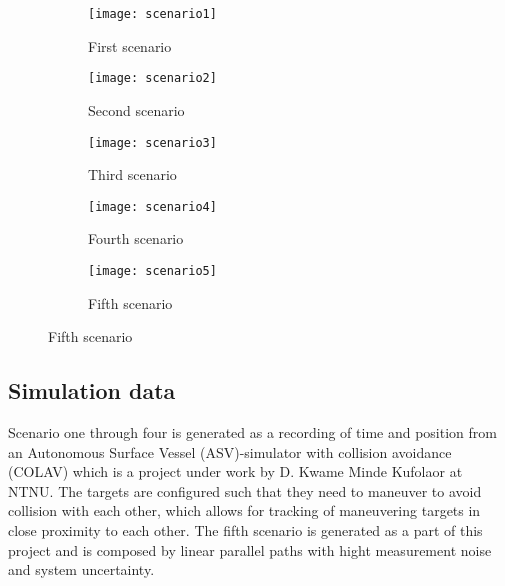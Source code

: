 \begin{figure}
    \centering   
    \begin{subfigure}{0.49\textwidth}
        \centering
        \texttt{[image: scenario1]}
        \caption{First scenario}
    \end{subfigure}
    \begin{subfigure}{0.49\textwidth}
        \centering
        \texttt{[image: scenario2]}
        \caption{Second scenario}
    \end{subfigure}
    \begin{subfigure}{0.49\textwidth}
        \centering
        \texttt{[image: scenario3]}
        \caption{Third scenario}
    \end{subfigure}
    \begin{subfigure}{0.49\textwidth}
        \centering
        \texttt{[image: scenario4]}
        \caption{Fourth scenario}
    \end{subfigure}
    \begin{subfigure}{0.49\textwidth}
        \centering
        \texttt{[image: scenario5]}
        \caption{Fifth scenario}
    \end{subfigure}
\end{figure}

\subsection{Simulation data}
Scenario one through four is generated as a recording of time and position from an Autonomous Surface Vessel (ASV)-simulator with collision avoidance (COLAV) which is a project under work by D. Kwame Minde Kufolaor at NTNU. The targets are configured such that they need to maneuver to avoid collision with each other, which allows for tracking of maneuvering targets in close proximity to each other. The fifth scenario is generated as a part of this project and is composed by linear parallel paths with hight measurement noise and system uncertainty.

